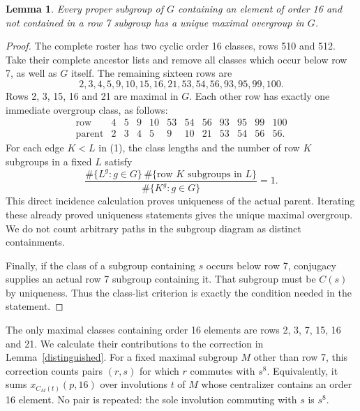 \documentclass[11pt,a4paper]{article}
\newtheorem{lemma}{Lemma}\newtheorem{theorem}{Theorem}
\begin{document}
\begin{lemma}\label{unique}
Every proper subgroup of $G$ containing an element of order 16
and not contained in a row 7 subgroup has a unique maximal
overgroup in $G$.
\end{lemma}
\begin{proof}
The complete roster has two cyclic order 16 classes, rows 510 and
512. Take their complete ancestor lists and remove all classes
which occur below row 7, as well as $G$ itself. The remaining
sixteen rows are
\[
2,3,4,5,9,10,15,16,21,53,54,56,93,95,99,100.
\]
Rows 2, 3, 15, 16 and 21 are maximal in $G$. Each other row has
exactly one immediate overgroup class, as follows:
\[
\begin{array}{c|rrrrrrrrrrr}
\text{row}&4&5&9&10&53&54&56&93&95&99&100\\\hline
\text{parent}&2&3&4&5&9&10&21&53&54&56&56.
\end{array}                                                     \tag{1}
\]
For each edge $K<L$ in (1), the class lengths and the number of
row $K$ subgroups in a fixed $L$ satisfy
\[
\frac{\#\{L^g:g\in G\}\,
       \#\{\text{row }K\text{ subgroups in }L\}}
      {\#\{K^g:g\in G\}}=1.
\]
This direct incidence calculation proves uniqueness of the actual
parent. Iterating these already proved uniqueness statements
gives the unique maximal overgroup. We do not count arbitrary
paths in the subgroup diagram as distinct containments.

Finally, if the class of a subgroup containing $s$ occurs below
row 7, conjugacy supplies an actual row 7 subgroup containing it.
That subgroup must be $C(s)$ by uniqueness. Thus the class-list
criterion is exactly the condition needed in the statement.
\end{proof}

The only maximal classes containing order 16 elements are
rows 2, 3, 7, 15, 16 and 21. We calculate their contributions
to the correction in Lemma~\ref{distinguished}. For a fixed
maximal subgroup $M$ other than row 7, this correction counts
pairs $(r,s)$ for which $r$ commutes with $s^8$. Equivalently,
it sums $x_{C_M(t)}(p,16)$ over involutions $t$ of $M$ whose
centralizer contains an order 16 element. No pair is repeated:
the sole involution commuting with $s$ is $s^8$.
\end{document}

